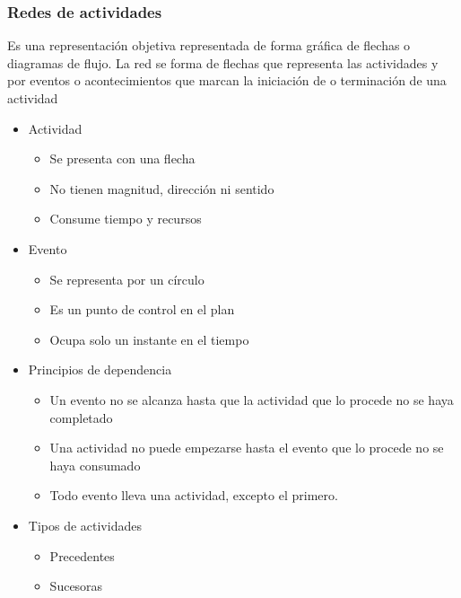 \subsubsection{Redes de actividades}
Es una representación objetiva representada de forma gráfica de flechas o diagramas de flujo. La red se forma de flechas que representa las actividades y por eventos o acontecimientos que marcan la iniciación de o terminación de una actividad
\begin{itemize}
    \item Actividad \begin{itemize}
        \item Se presenta con una flecha
        \item No tienen magnitud, dirección ni sentido
        \item Consume tiempo y recursos
    \end{itemize}
    \item Evento \begin{itemize}
        \item Se representa por un círculo
        \item Es un punto de control en el plan
        \item Ocupa solo un instante en el tiempo
    \end{itemize}
    \item Principios de dependencia \begin{itemize}
        \item Un evento no se alcanza hasta que la actividad que lo procede no se haya completado 
        \item Una actividad no puede empezarse hasta el evento que lo procede no se haya consumado
        \item Todo evento lleva una actividad, excepto el primero.
    \end{itemize}
    \item Tipos de actividades \begin{itemize}
        \item Precedentes
        \item Sucesoras
    \end{itemize}
\end{itemize}
